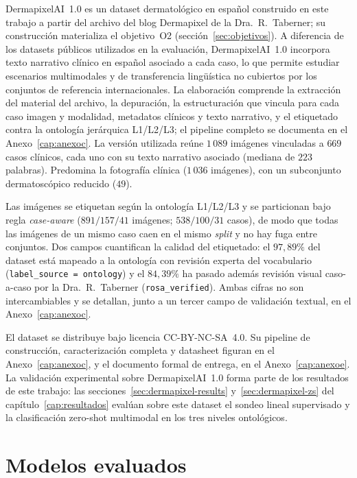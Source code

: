 DermapixelAI~1.0 es un dataset dermatológico en español construido
en este trabajo a partir del archivo del blog Dermapixel de la
Dra.~R.~Taberner; su construcción materializa el objetivo~O2
(sección~\ref{sec:objetivos}). A diferencia de los datasets públicos
utilizados en la evaluación, DermapixelAI~1.0 incorpora texto
narrativo clínico en español asociado a cada caso, lo que permite
estudiar escenarios multimodales y de transferencia lingüística no
cubiertos por los conjuntos de referencia internacionales. La
elaboración comprende la
extracción del material del archivo, la depuración, la
estructuración que vincula para cada caso imagen y modalidad,
metadatos clínicos y texto narrativo, y el etiquetado contra la
ontología jerárquica L1/L2/L3; el pipeline completo se documenta en
el Anexo~\ref{cap:anexoc}. La versión utilizada reúne $1\,089$
imágenes vinculadas a $669$ casos clínicos, cada uno con su texto
narrativo asociado (mediana de $223$ palabras). Predomina la
fotografía clínica ($1\,036$ imágenes), con un subconjunto
dermatoscópico reducido ($49$).

Las imágenes se etiquetan según la ontología L1/L2/L3 y se
particionan bajo regla \emph{case-aware} ($891 / 157 / 41$
imágenes; $538 / 100 / 31$ casos), de modo que todas las imágenes
de un mismo caso caen en el mismo \emph{split} y no hay fuga entre
conjuntos. Dos campos cuantifican la calidad del etiquetado: el
$97{,}89\%$ del dataset está mapeado a la ontología con revisión
experta del vocabulario (\texttt{label\_source = ontology}) y el
$84{,}39\%$ ha pasado además revisión visual caso-a-caso por la
Dra.~R.~Taberner (\texttt{rosa\_verified}). Ambas cifras no son
intercambiables y se detallan, junto a un tercer campo de validación
textual, en el Anexo~\ref{cap:anexoc}.

El dataset se distribuye bajo licencia CC-BY-NC-SA~4.0. Su pipeline
de construcción, caracterización completa y datasheet figuran en el
Anexo~\ref{cap:anexoc}, y el documento formal de entrega, en el
Anexo~\ref{cap:anexoe}. La validación experimental sobre
DermapixelAI~1.0 forma parte de los resultados de este trabajo: las
secciones~\ref{sec:dermapixel-results} y~\ref{sec:dermapixel-zs} del
capítulo~\ref{cap:resultados} evalúan sobre este dataset el sondeo
lineal supervisado y la clasificación zero-shot multimodal en los
tres niveles ontológicos.

\section{Modelos evaluados}
\label{sec:modelos}

